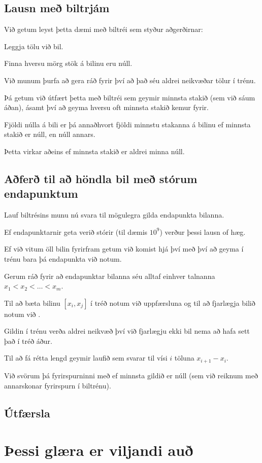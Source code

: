 \subsection{Lausn með biltrjám}
{
    {
        \item<1-> Við getum leyst þetta dæmi með biltréi sem styður aðgerðirnar:
        {
            \item<2-> Leggja tölu við bil.
            \item<3-> Finna hversu mörg stök á bilinu eru núll.
        }
        \item<4-> Við munum þurfa að gera ráð fyrir því að það séu aldrei neikvæðar tölur í trénu.
        \item<5-> Þá getum við útfært þetta með biltréi sem geymir minnsta stakið (sem við sáum áðan),
                    ásamt því að geyma hversu oft minnsta stakið kemur fyrir.
        \item<6-> Fjöldi núlla á bili er þá annaðhvort fjöldi minnstu stakanna á bilinu ef minnsta stakið er núll, en núll annars.
        \item<7-> Þetta virkar aðeins ef minnsta stakið er aldrei minna núll.
    }
}

\subsection{Aðferð til að höndla bil með stórum endapunktum}
{
    {
        \item<1-> Lauf biltrésins munu nú svara til mögulegra gilda endapunkta bilanna.
        \item<2-> Ef endapunktarnir geta verið stórir (til dæmis $10^9$) verður þessi lausn of hæg.
        \item<3-> Ef við vitum öll bilin fyrirfram getum við komist hjá því með því að geyma í trénu bara þá endapunkta við notum.
        \item<4-> Gerum ráð fyrir að endapunktar bilanna séu alltaf einhver talnanna $x_1 < x_2 < \dots < x_m$.
        \item<5-> Til að bæta bilinu $[x_i, x_j]$ í tréð notum við uppfærsluna 
                    og til að fjarlægja bilið notum við .
        \item<6-> Gildin í trénu verða aldrei neikvæð því við fjarlægju ekki bil nema að hafa sett það í tréð áður.
        \item<7-> Til að fá rétta lengd geymir laufið sem svarar til vísi $i$ töluna $x_{i + 1} - x_i$.
        \item<8-> Við svörum þá fyrirspurninni með  ef minnsta gildið er núll (sem við reiknum með annarskonar fyrirspurn í biltrénu).
    }
}

\subsection{Útfærsla}
{
}

{
}

{
}

\section{Þessi glæra er viljandi auð}
{
}


